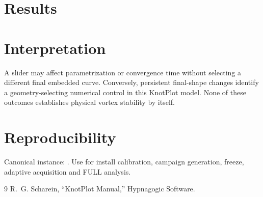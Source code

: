 \documentclass[11pt,a4paper]{article}
\begin{document}
\section{Results}
\section{Interpretation}
A slider may affect parametrization or convergence time without selecting a different final embedded curve. Conversely, persistent final-shape changes identify a geometry-selecting numerical control in this KnotPlot model. None of these outcomes establishes physical vortex stability by itself.
\section{Reproducibility}
Canonical instance: . Use  for install calibration, campaign generation, freeze, adaptive acquisition and FULL analysis.
\begin{thebibliography}{9}
 R.~G. Scharein, ``KnotPlot Manual,'' Hypnagogic Software.
\end{thebibliography}
\end{document}
